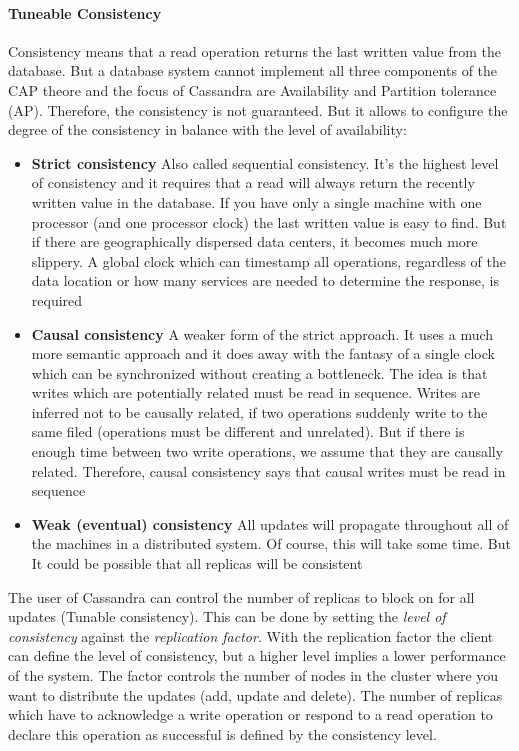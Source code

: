 \documentclass[a4paper]{article}
\begin{document}
\paragraph{Tuneable Consistency}
Consistency means that a read operation returns the last written value from the database. But a database system cannot implement all three components of the CAP theore and the focus of Cassandra are Availability and Partition tolerance (AP). Therefore, the consistency is not guaranteed. But it allows to configure the degree of the consistency in balance with the level of availability: 
\begin{itemize}
	\item \textbf{Strict consistency} Also called sequential consistency. It's the highest level of consistency and it requires that a read will always return the recently written value in the database. If you have only a single machine with one processor (and one processor clock) the last written value is easy to find. But if there are geographically dispersed data centers, it becomes much more slippery. A global clock which can timestamp all operations, regardless of the data location or how many services are needed to determine the response, is required 
	\item \textbf{Causal consistency} A weaker form of the strict approach. It uses a much more semantic approach and it does away with the fantasy of a single clock which can be synchronized without creating a bottleneck. The idea is that writes which are potentially related must be read in sequence. Writes are inferred not to be causally related, if two operations suddenly write to the same filed (operations must be different and unrelated). But if there is enough time between two write operations, we assume that they are causally related. Therefore, causal consistency says that causal writes must be read in sequence 
	\item \textbf{Weak (eventual) consistency} All updates will propagate throughout all of the machines in a distributed system. Of course, this will take some time. But It could be possible that all replicas will be consistent 
\end{itemize}
The user of Cassandra can control the number of replicas to block on for all updates (Tunable consistency). This can be done by setting the \textit{level of consistency} against the \textit{replication factor}. With the replication factor the client can define the level of consistency, but a higher level implies a lower performance of the system. The factor controls the number of nodes in the cluster where you want to distribute the updates (add, update and delete). The number of replicas which have to acknowledge a write operation or respond to a read operation to declare this operation as successful is defined by the consistency level.
\end{document}
